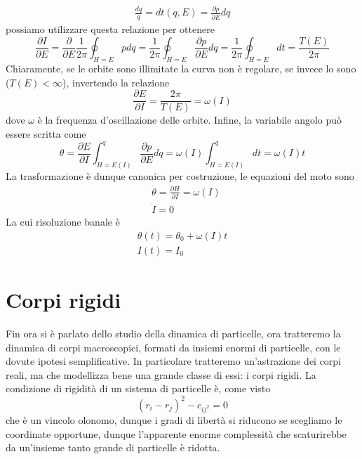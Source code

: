 \documentclass[
10pt, %
a4paper, %
oneside, %
headinclude,footinclude, %
BCOR5mm, %
]{scrartcl}
\begin{document}
\begin{align*}
 \frac{dq}{\dot{q}}= dt(q, E) = \frac{\partial p}{\partial E}dq
\end{align*}
possiamo utilizzare questa relazione per ottenere
\[\frac{\partial I}{\partial E} = \frac{\partial}{\partial E}\frac{1}{2\pi}\oint_{H = E}pdq = \frac{1}{2\pi}\oint_{H = E}\frac{\partial p}{\partial E}dq = \frac{1}{2\pi}\oint_{H = E}dt = \frac{T(E)}{2\pi}\]
Chiaramente, se le orbite sono illimitate la curva non è regolare, se invece lo sono (\(T(E)<\infty\)), invertendo la relazione 
\[\frac{\partial E}{\partial I} = \frac{2\pi}{T(E)} = \omega (I)\]
dove $\omega$ è la frequenza d'oscillazione delle orbite. Infine, la variabile angolo può essere scritta come
\[\theta =  \frac{\partial E}{\partial I}\int_{H = E(I)}^q\frac{\partial p}{\partial E}dq = \omega (I)\int_{H = E(I)}^qdt = \omega(I)t \]
La trasformazione è dunque canonica per costruzione, le equazioni del moto sono
\begin{align*}
	&\dot{\theta} = \frac{\partial H}{\partial I}=\omega(I) \\
	&\dot{I} = 0
\end{align*}
La cui risoluzione banale è
\begin{align*}
	\theta(t) = \theta_0 +\omega(I)t\\I(t) = I_0
\end{align*}

\newpage
\section{Corpi rigidi}
Fin ora si è parlato dello studio della dinamica di particelle, ora tratteremo la dinamica di corpi macroscopici, formati da insiemi enormi di particelle, con le dovute ipotesi semplificative. In particolare tratteremo un'astrazione dei corpi reali, ma che modellizza bene una grande classe di essi: i corpi rigidi. La condizione di rigidità di un sistema di particelle è, come visto
\[(r_i-r_j)^2-c_{ij^2} = 0\]
che è un vincolo olonomo, dunque i gradi di libertà si riducono se scegliamo le coordinate opportune, dunque l'apparente enorme complessità che scaturirebbe da un'insieme tanto grande di particelle è ridotta.
\end{document}
